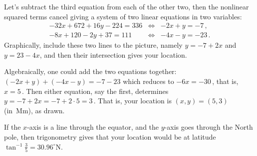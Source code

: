 \begin{example}
\begin{solution}
Let's subtract the third equation from each of the other two, then the nonlinear squared terms cancel giving a system of two linear equations in two variables:
\begin{eqnarray*}
-32x+672+16y-224=336&\iff&-2x+y=-7\,,
\\-8x+120-2y+37=111&\iff&-4x-y=-23\,.
\end{eqnarray*}%
%
Graphically, include these two lines to the picture, namely \(y=-7+2x\) and \(y=23-4x\), and then their intersection gives your location.

Algebraically, one could add the two equations together: \((-2x+y)+(-4x-y)=-7-23\) which reduces to \(-6x=-30\)\,, that is, \(x=5\)\,.
Then either equation, say the first, determines~\(y=-7+2x=-7+2\cdot 5=3\)\,.  
That is, your location is \((x,y)=(5,3)\) (in~Mm), as drawn.
\end{solution}
If the \(x\)-axis is a line through the equator, and the \(y\)-axis goes through the North pole, then trigonometry gives that your location would be at latitude
\(\tan^{-1}\frac35=30.96^\circ\)N.
\end{example}





